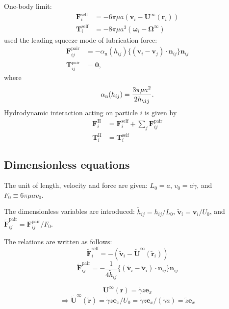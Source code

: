 \documentclass[11pt]{scrartcl}
\begin{document}
One-body limit:
\begin{align}
 \bm{F}_i^{\mathrm{self}} &= 
-6 \pi \mu a ( \bm{v}_i - \bm{U}^{\infty} (\bm{r}_i) ) \\
 \bm{T}_i^{\mathrm{self}} &= 
-8 \pi \mu a^3 ( \bm{\omega}_i - \bm{\Omega}^{\infty})
\end{align}
%
\citet{Melrose_2004a} used
the leading squeeze mode of lubrication force:
\begin{align}
 \bm{F}_{ij}^{\mathrm{pair}}
&=
- \alpha_{\mathrm{n}}(h_{ij})
\bigl\{
(\bm{v}_i - \bm{v}_j)
\cdot \bm{n}_{ij}
\bigr\}
\bm{n}_{ij} \\
 \bm{T}_{ij}^{\mathrm{pair}}
&=
\bm{0},
\end{align}
where
\begin{equation}
 \alpha_{\mathrm{n}}(h_{ij}) = 
\frac{3 \pi \mu a^2}{2 h_{\ij}}.
\end{equation}
Hydrodynamic interaction acting on particle $i$
is given by
\begin{align}
\bm{F}_i^{\mathrm{H}}
&=
\bm{F}_i^{\mathrm{self}}
+
\sum_j
\bm{F}_{ij}^{\mathrm{pair}} \\
\bm{T}_i^{\mathrm{H}}
&=
\bm{T}_i^{\mathrm{self}}
\end{align}


\subsection*{Dimensionless equations}

The unit of length, velocity and force 
are given:
$L_0 = a$,  $v_0 = a \dot{\gamma}$, and $F_0 \equiv 6 \pi \mu a v_0$.

The dimensionless variables are introduced:
$\tilde{h}_{ij} = h_{ij} / L_0$,
$\tilde{\bm{v}}_i = \bm{v}_i / U_0$,
and $\tilde{\bm{F}}_{ij}^{\mathrm{pair}} = \bm{F}_{ij}^{\mathrm{pair}} / F_0$.

The relations are written as follows:
\begin{equation}
 \tilde{\bm{F}}_i^{\mathrm{self}} = 
-( \tilde{\bm{v}}_i - 
\tilde{\bm{U}}^{\infty} 
(\tilde{\bm{r}}_i) )
\end{equation}
\begin{equation}
 \tilde{\bm{F}}_{ij}^{\mathrm{pair}}
= 
- \frac{1}{4 \tilde{h}_{ij}}
\bigl\{
(\tilde{\bm{v}}_i-
\tilde{\bm{v}}_i)\cdot
\bm{n}_{ij}
\bigr\}\bm{n}_{ij}
\end{equation}

\begin{equation}
 \bm{U}^{\infty}(\bm{r})
 = 
 \dot{\gamma} z \bm{e}_{x}
\end{equation}
\begin{equation}
\Longrightarrow
  \tilde{\bm{U}}^{\infty}(\tilde{\bm{r}})
 = 
 \dot{\gamma} z \bm{e}_{x} / U_0
=  \dot{\gamma} z \bm{e}_{x} / (\dot{\gamma} a)
= \tilde{z} \bm{e}_{x} 
\end{equation}
\end{document}

